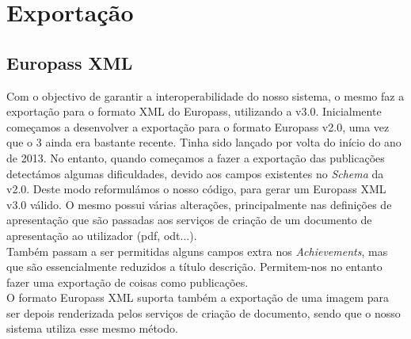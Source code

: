 \documentclass[a4paper,11pt,openright,openbib]{article}
\begin{document}
\section{Exportação}
\subsection{Europass XML}
Com o objectivo de garantir a interoperabilidade do nosso sistema, o mesmo faz a exportação para o formato XML do Europass, utilizando a v3.0. Inicialmente começamos a desenvolver a exportação para o formato Europass v2.0, uma vez que o 3 ainda era bastante recente. Tinha sido lançado por volta do início do ano de 2013. No entanto, quando começamos a fazer a exportação das publicações detectámos algumas dificuldades, devido aos campos existentes no \emph{Schema} da v2.0. Deste modo reformulámos o nosso código, para gerar um Europass XML v3.0 válido. O mesmo possui várias alterações, principalmente nas definições de apresentação que são passadas aos serviços de criação de um documento de apresentação ao utilizador (pdf, odt...).\\
Também passam a ser permitidas alguns campos extra nos \emph{Achievements}, mas que são essencialmente reduzidos a título descrição. Permitem-nos no entanto fazer uma exportação de coisas como publicações.\\
O formato Europass XML suporta também a exportação de uma imagem para ser depois renderizada pelos serviços de criação de documento, sendo que o nosso sistema utiliza esse mesmo método.
\end{document}

